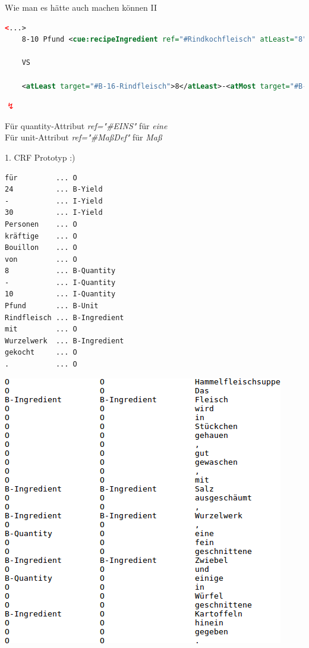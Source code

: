 \documentclass[12pt]{beamer}
\begin{document}
\begin{frame}[fragile]{Wie man es hätte auch machen können II}
	\begin{lstlisting}[language=XML]
	<...>
	8-10 Pfund <cue:recipeIngredient ref="#Rindkochfleisch" atLeast="8" atMost="10" unit="Pfund">Rindfleisch</cue:recipeIngredient>
	
	VS
	
	<atLeast target="#B-16-Rindfleisch">8</atLeast>-<atMost target="#B-16-Rindfleisch">10</atMost> <unit target="#B-16-Rindfleisch">Pfund</unit> <recipeIngredient xml:id="B-16-Rindfleisch" ref="#Suppenrindfleisch">Rindfleisch</recipeIngredient>
	\end{lstlisting}
	
	\begin{center}
		\textcolor{red}{\Large{$\lightning$}}
	\end{center}
	Für quantity-Attribut \textit{ref="\#EINS"} für \textit{eine} \\
	Für unit-Attribut \textit{ref="\#MaßDef"} für \textit{Maß}
\end{frame}


\begin{frame}[fragile]{1. CRF Prototyp :)}
	\vspace{-0.7em}\begin{lstlisting}
für			...	O
24			... B-Yield
-			... I-Yield
30			... I-Yield
Personen	...	O
kräftige	... O
Bouillon	... O
von			...	O
8			...	B-Quantity
-			...	I-Quantity
10			...	I-Quantity
Pfund		...	B-Unit
Rindfleisch	... B-Ingredient
mit			...	O
Wurzelwerk	...	B-Ingredient
gekocht		...	O
.			...	O
	\end{lstlisting}
\end{frame}	

\begin{frame}
	\includegraphics[scale=0.9]{Images/crfPrototypTagging}
\end{frame}
\end{document}
